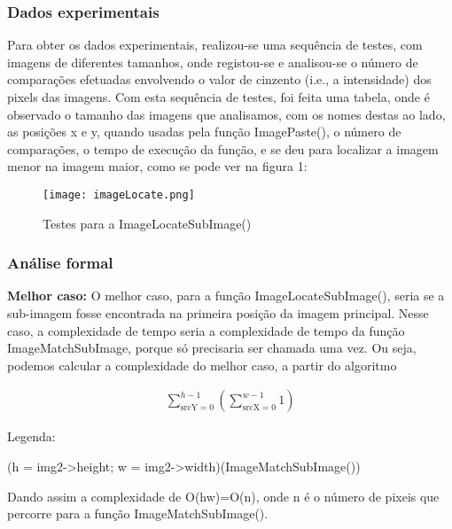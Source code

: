 \documentclass{article}
\begin{document}
\subsubsection{Dados experimentais}

Para obter os dados experimentais, realizou-se uma sequência de testes, com imagens de diferentes tamanhos, onde registou-se e
analisou-se o número de comparações efetuadas envolvendo o valor de cinzento (i.e., a
intensidade) dos pixels das imagens. 
Com esta sequência de testes, foi feita uma tabela, onde é observado o tamanho das imagens que analisamos, 
com os nomes destas ao lado, 
as posições x e y, quando usadas pela função ImagePaste(), o número de comparações, o tempo de execução da função, e 
se deu para localizar a imagem menor na imagem maior, como se pode ver na figura 1:



\begin{figure}[h]
    \centering
    \texttt{[image: imageLocate.png]}
    \caption{Testes para a ImageLocateSubImage()}
    \label{fig:Figura 1}
\end{figure}

\subsubsection{Análise formal}


\textbf{Melhor caso:}
O melhor caso, para a função ImageLocateSubImage(), seria se a sub-imagem fosse
encontrada na primeira posição da imagem principal. Nesse caso, a complexidade de tempo
seria a complexidade de tempo da função ImageMatchSubImage, porque só precisaria ser chamada uma vez.
Ou seja, podemos calcular a complexidade do melhor caso, a partir do algoritmo

\begin{align*}
\sum_{\text{srcY}=0}^{h-1} (\sum_{\text{srcX}=0}^{w-1}1)
\end{align*}

\begin{center}
Legenda:

(h = img2->height; w = img2->width)(ImageMatchSubImage())
\end{center}

Dando assim a complexidade de O(hw)=O(n), onde n é o número de pixeis que percorre para a função ImageMatchSubImage().\\
\end{document}
